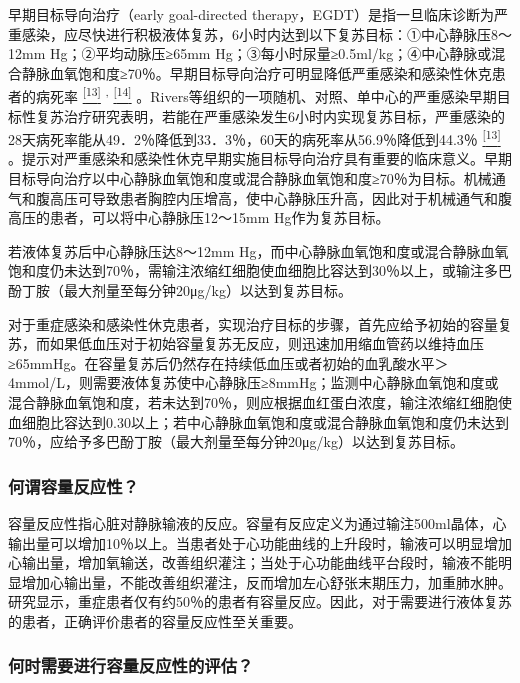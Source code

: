 早期目标导向治疗（early goal-directed
therapy，EGDT）是指一旦临床诊断为严重感染，应尽快进行积极液体复苏，6小时内达到以下复苏目标：①中心静脉压8～12mm
Hg；②平均动脉压≥65mm
Hg；③每小时尿量≥0.5ml/kg；④中心静脉或混合静脉血氧饱和度≥70％。早期目标导向治疗可明显降低严重感染和感染性休克患者的病死率
\protect\hyperlink{text00008.htmlux5cux23ch13-7}{\textsuperscript{{[}13{]}}}
\textsuperscript{,}
\protect\hyperlink{text00008.htmlux5cux23ch14-7}{\textsuperscript{{[}14{]}}}
。Rivers等组织的一项随机、对照、单中心的严重感染早期目标性复苏治疗研究表明，若能在严重感染发生6小时内实现复苏目标，严重感染的28天病死率能从49．2％降低到33．3％，60天的病死率从56.9％降低到44.3％
\protect\hyperlink{text00008.htmlux5cux23ch13-7}{\textsuperscript{{[}13{]}}}
。提示对严重感染和感染性休克早期实施目标导向治疗具有重要的临床意义。早期目标导向治疗以中心静脉血氧饱和度或混合静脉血氧饱和度≥70％为目标。机械通气和腹高压可导致患者胸腔内压增高，使中心静脉压升高，因此对于机械通气和腹高压的患者，可以将中心静脉压12～15mm
Hg作为复苏目标。

若液体复苏后中心静脉压达8～12mm
Hg，而中心静脉血氧饱和度或混合静脉血氧饱和度仍未达到70％，需输注浓缩红细胞使血细胞比容达到30％以上，或输注多巴酚丁胺（最大剂量至每分钟20μg/kg）以达到复苏目标。

对于重症感染和感染性休克患者，实现治疗目标的步骤，首先应给予初始的容量复苏，而如果低血压对于初始容量复苏无反应，则迅速加用缩血管药以维持血压≥65mmHg。在容量复苏后仍然存在持续低血压或者初始的血乳酸水平＞4mmol/L，则需要液体复苏使中心静脉压≥8mmHg；监测中心静脉血氧饱和度或混合静脉血氧饱和度，若未达到70％，则应根据血红蛋白浓度，输注浓缩红细胞使血细胞比容达到0.30以上；若中心静脉血氧饱和度或混合静脉血氧饱和度仍未达到70％，应给予多巴酚丁胺（最大剂量至每分钟20μg/kg）以达到复苏目标。

\subsubsection{何谓容量反应性？}

容量反应性指心脏对静脉输液的反应。容量有反应定义为通过输注500ml晶体，心输出量可以增加10％以上。当患者处于心功能曲线的上升段时，输液可以明显增加心输出量，增加氧输送，改善组织灌注；当处于心功能曲线平台段时，输液不能明显增加心输出量，不能改善组织灌注，反而增加左心舒张末期压力，加重肺水肿。研究显示，重症患者仅有约50％的患者有容量反应。因此，对于需要进行液体复苏的患者，正确评价患者的容量反应性至关重要。

\subsubsection{何时需要进行容量反应性的评估？}

